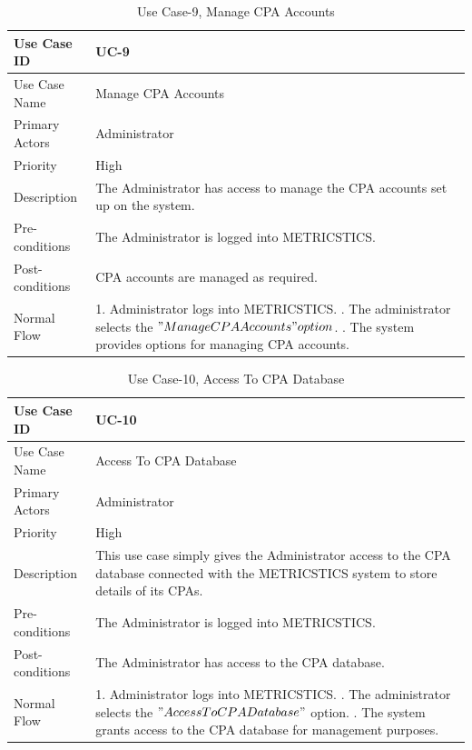 \begin{table}[H]
\centering
\def\arraystretch{1.5}
\begin{tabular}{|l|p{4.5in}|}
\hline
Use Case ID & UC-9\\ \hline
Use Case Name & Manage CPA Accounts\\ \hline
Primary Actors & Administrator\\ \hline
Priority & High\\ \hline
Description & The Administrator has access to manage the CPA accounts set up on the system.\\ \hline
Pre-conditions & The Administrator is logged into METRICSTICS.\\ \hline
Post-conditions & CPA accounts are managed as required.\\ \hline
Normal Flow & 1. Administrator logs into METRICSTICS.
     \newline 2. The administrator selects the $"Manage CPA Accounts" option$.
     \newline 3. The system provides options for managing CPA accounts.
    \\ \hline
\end{tabular}
\caption{Use Case-9, Manage CPA Accounts}
\end{table}


\begin{table}[H]
\centering
\def\arraystretch{1.5}
\begin{tabular}{|l|p{4.5in}|}
\hline
Use Case ID & UC-10\\ \hline
Use Case Name & Access To CPA Database\\ \hline
Primary Actors & Administrator\\ \hline
Priority & High\\ \hline
Description & This use case simply gives the Administrator access to the CPA database connected with the METRICSTICS system to store details of its CPAs.\\ \hline
Pre-conditions & The Administrator is logged into METRICSTICS.\\ \hline
Post-conditions & The Administrator has access to the CPA database.\\ \hline
Normal Flow & 1. Administrator logs into METRICSTICS.
     \newline 2. The administrator selects the $"Access To CPA Database"$ option.
     \newline 3. The system grants access to the CPA database for management purposes.
    \\ \hline
\end{tabular}
\caption{Use Case-10, Access To CPA Database}
\end{table}